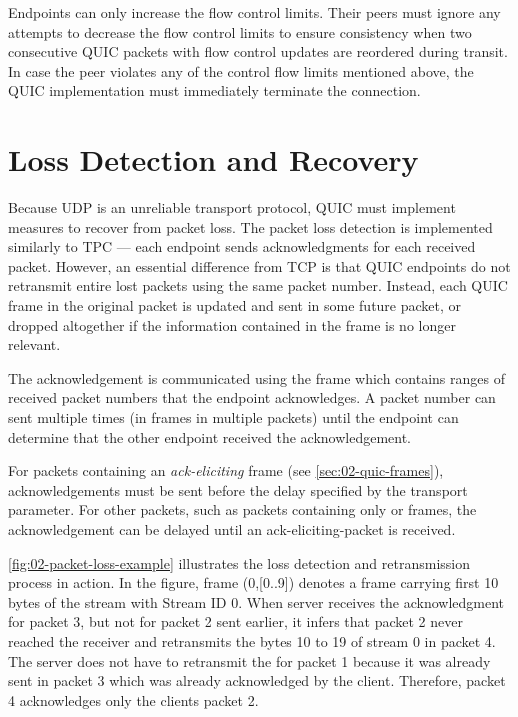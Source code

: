 Endpoints can only increase the flow control limits. Their peers must ignore any attempts to
decrease the flow control limits to ensure consistency when two consecutive QUIC packets with flow
control updates are reordered during transit. In case the peer violates any of the control flow
limits mentioned above, the QUIC implementation must immediately terminate the connection.

\section{Loss Detection and Recovery}

Because UDP is an unreliable transport protocol, QUIC must implement measures to recover from packet
loss. The packet loss detection is implemented similarly to TPC --- each endpoint sends
acknowledgments for each received packet. However, an essential difference from TCP is that QUIC
endpoints do not retransmit entire lost packets using the same packet number. Instead, each QUIC
frame in the original packet is updated and sent in some future packet, or dropped altogether if the
information contained in the frame is no longer relevant.

The acknowledgement is communicated using the \ACK{} frame which contains ranges of received packet
numbers that the endpoint acknowledges. A packet number can sent multiple times (in \ACK{} frames in
multiple packets) until the endpoint can determine that the other endpoint received the
acknowledgement.

For packets containing an \textit{ack-eliciting} frame (see \autoref{sec:02-quic-frames}),
acknowledgements must be sent before the delay specified by the \MaxAckDelay{} transport
parameter. For other packets, such as packets containing only \ACK{} or \PADDING{} frames, the
acknowledgement can be delayed until an \gls{ack-eliciting-packet} is received.

\autoref{fig:02-packet-loss-example} illustrates the loss detection and retransmission process in
action. In the figure, frame \STREAM{}(0,[0..9]) denotes a \STREAM{} frame carrying first 10 bytes
of the stream with Stream ID 0. When server receives the acknowledgment for packet 3, but not for
packet 2 sent earlier, it infers that packet 2 never reached the receiver and retransmits the bytes
10 to 19 of stream 0 in packet 4. The server does not have to retransmit the \ACK{} for packet 1
because it was already sent in packet 3 which was already acknowledged by the client. Therefore,
packet 4 acknowledges only the clients packet 2.

